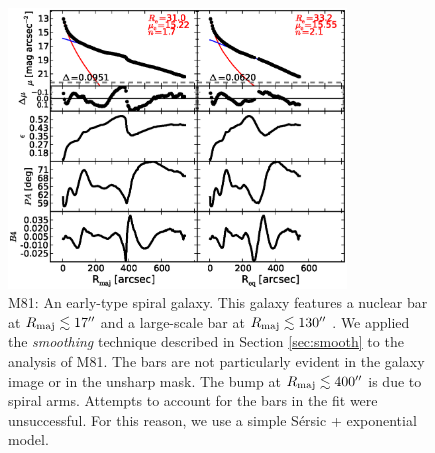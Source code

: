 \documentclass[preprint2]{emulateapj}
\newcommand{\fitfigurewidth}{0.8\textwidth}
\begin{document}
  \begin{figure}[h]
  \begin{center}
  \includegraphics[width=\fitfigurewidth]{m81_1Dfit.eps}
  \caption{M81: 
  An early-type spiral galaxy.
  This galaxy features a nuclear bar at $R_{\rm maj} \lesssim 17''$ and a large-scale bar at $R_{\rm maj} \lesssim 130''$ 
  \citep{elmegreen1995m81,gutierrez2011,erwindebattista2013}. 
  We applied the \emph{smoothing} technique described in Section \ref{sec:smooth} to the analysis of M81.
  The bars are not particularly evident in the galaxy image or in the unsharp mask. 
  The bump at $R_{\rm maj} \lesssim 400''$ is due to spiral arms. 
  Attempts to account for the bars in the fit were unsuccessful. 
  For this reason, we use a simple S\'ersic + exponential model. 
  }
  \end{center}
  \end{figure}
\end{document}
